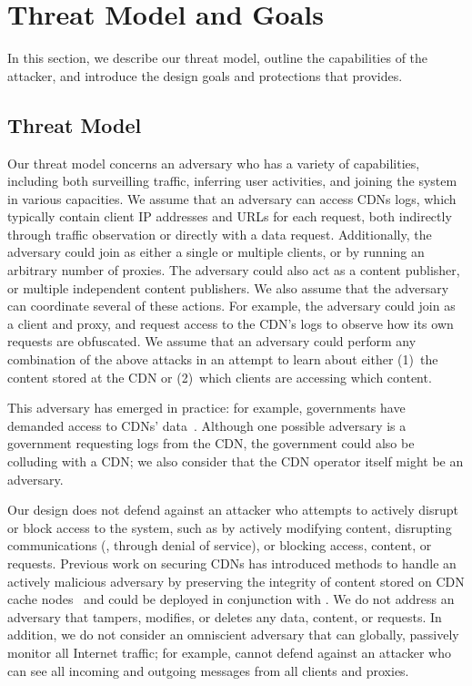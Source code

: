 \section{Threat Model and Goals}
\label{sec:threat}
In this section, we describe our threat model, outline the capabilities of the 
attacker, and introduce the design goals and protections that \system{} provides.

\subsection{Threat Model}
\label{sec:attacker}

Our threat model concerns an adversary who has a variety of capabilities,
including both surveilling traffic, inferring user activities, and joining
the system in various capacities.
We assume that an adversary can access CDNs logs, which typically contain client IP addresses and URLs for each request, both indirectly through traffic observation or directly with a data request. Additionally,
the adversary could join \system{} as either a single or multiple clients,
or by running an arbitrary number of \system{} proxies.  The adversary could 
also act as a content publisher, or multiple independent content
publishers. We also assume that the adversary
can coordinate several of these actions.  For example, the 
adversary could join as a client and proxy, and request access to the CDN's
logs to observe how its own requests are obfuscated.  We assume that an adversary could perform any combination of the above attacks in an attempt to learn about either (1)~the content stored at the CDN or (2)~which clients are accessing which content.  

This adversary has emerged in practice:
for example, governments have demanded access to CDNs'
data~\cite{cloudflare_nsl}. Although one possible adversary is a government
requesting logs from the CDN, the government could also be colluding with a
CDN; we also consider that the CDN operator itself might be an adversary.

Our design does not defend against an attacker who attempts to actively
disrupt or block access to the system, such as by actively modifying content,
disrupting communications (\eg, through denial of service), or blocking
access, content, or requests. Previous work on securing CDNs has introduced
methods to handle an actively malicious adversary by preserving the integrity
of content  stored on CDN cache nodes~\cite{levy2015stickler} and could be
deployed in conjunction with \system{}. We do not address an adversary that
tampers, modifies, or deletes any data, content, or requests.  In addition, we
do not consider an omniscient adversary that can globally, passively monitor
all Internet traffic; for example, \system{} cannot defend against an attacker
who can see all incoming and outgoing messages from all clients and proxies.

